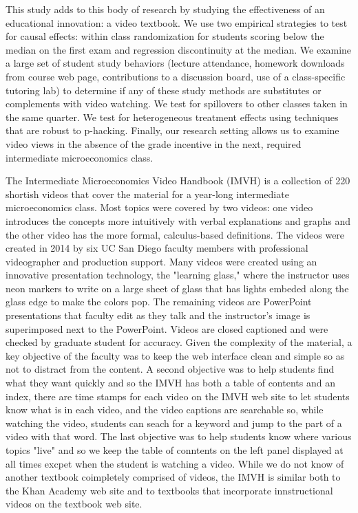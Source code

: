 \documentclass[12pt]{article}
\begin{document}
This study adds to this body of research by studying the effectiveness of an educational innovation: a video textbook. We use two empirical strategies to test for causal effects: within class randomization for students scoring below the median on the first exam and regression discontinuity at the median. We examine a large set of student study behaviors (lecture attendance, homework downloads from course web page, contributions to a discussion board, use of a class-specific tutoring lab) to determine if any of these study methods are substitutes or complements with video watching. We test for spillovers to other classes taken in the same quarter. We test for heterogeneous treatment effects using techniques that are robust to p-hacking. Finally, our research setting allows us to examine video views in the absence of the grade incentive in the next, required intermediate microeconomics class.


The Intermediate Microeconomics Video Handbook (IMVH) is a collection of 220 shortish videos that cover the material for a year-long intermediate microeconomics class. Most topics were covered by two videos: one video introduces the concepts more intuitively with verbal explanations and graphs and the other video has the more formal, calculus-based definitions. The videos were created in 2014 by six UC San Diego faculty members with professional videographer and production support. Many videos were created using an innovative presentation technology, the "learning glass," where the instructor uses neon markers to write on a large sheet of glass that has lights embeded along the glass edge to make the colors pop. The remaining videos are PowerPoint presentations that faculty edit as they talk and the instructor's image is superimposed next to the PowerPoint. Videos are closed captioned and were checked by graduate student for accuracy. Given the complexity of the material, a key objective of the faculty was to keep the web interface clean and simple so as not to distract from the content. A second objective was to help students find what they want quickly and so the IMVH has both a table of contents and an index, there are time stamps for each video on the IMVH web site to let students know what is in each video, and the video captions are searchable so, while watching the video, students can seach for a keyword and jump to the part of a video with that word. The last objective was to help students know where various topics "live" and so we keep the table of conntents on the left panel displayed at all times excpet when the student is watching a video. While we do not know of another textbook coimpletely comprised of videos, the IMVH is similar both to the Khan Academy web site and to textbooks that incorporate innstructional videos on the textbook web site.
\end{document}
